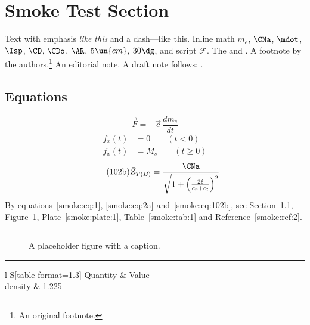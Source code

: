 \section{Smoke Test Section}\label{smoke:sec:1}
Text with emphasis \emph{like this} and a dash---like this. Inline math $m_e$, $\CNa$, $\mdot$,
$\Isp$, $\CD$, $\CDo$, $\AR$, $5\un{cm}$, $30\dg$, and script $\mathscr{F}$. The \CG{} and \CP{}.
A footnote by the authors.\footnote{An original footnote.} An editorial note. A draft note follows: .
\subsection{Equations}\label{smoke:sec:1.1}
\begin{equation}\label{smoke:eq:1}
  \vec{F} = -\vec{c}\,\frac{dm_e}{dt}
\end{equation}
\begin{subequations}\label{smoke:eq:2}
\begin{align}
  f_x(t) &= 0 \qquad (t < 0) \label{smoke:eq:2a}\\
  f_x(t) &= M_s \qquad (t \ge 0) \label{smoke:eq:2b}
\end{align}
\end{subequations}
\begin{equation}\tag{102b}\label{smoke:eq:102b}
  \bar{Z}_{T(B)} = \frac{\CNa}{\sqrt{1+\left(\frac{2\ell}{c_r+c_t}\right)^2}}
\end{equation}
By equations~\eqref{smoke:eq:1}, \eqref{smoke:eq:2a} and~\eqref{smoke:eq:102b}, see
Section~\ref{smoke:sec:1.1}, Figure~\ref{smoke:fig:1}, Plate~\ref{smoke:plate:1},
Table~\ref{smoke:tab:1} and Reference~\ref{smoke:ref:2}.
\begin{figure}[htbp]
  \centering
  \rule{4cm}{3cm}
  \caption{A placeholder figure with a caption. }
  \label{smoke:fig:1}
\end{figure}
\begin{plate}[htbp]
  \centering
  \rule{4cm}{2cm}
  \caption{A placeholder plate.}
  \label{smoke:plate:1}
\end{plate}
\begin{table}[htbp]
  \caption{A small table.}
  \label{smoke:tab:1}
  \centering
  \begin{tabular}{l S[table-format=1.3]}
    \toprule Quantity & {Value} \\ \midrule
    density & 1.225 \\
    \bottomrule
  \end{tabular}
\end{table}

